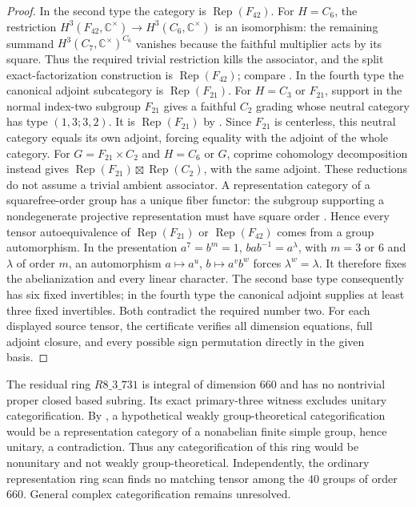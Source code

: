 \begin{proof}
In the second type the category is $\operatorname{Rep}(F_{42})$.
For $H=C_6$, the restriction $H^3(F_{42},\mathbb C^\times)\to
H^3(C_6,\mathbb C^\times)$ is an isomorphism: the remaining summand
$H^3(C_7,\mathbb C^\times)^{C_6}$ vanishes because the faithful
multiplier acts by its square. Thus the required trivial restriction
kills the associator, and the split exact-factorization construction
is $\operatorname{Rep}(F_{42})$; compare
\cite[Corollary~7.4]{EGODimPQ}.
In the fourth type the canonical adjoint subcategory is
$\operatorname{Rep}(F_{21})$. For $H=C_3$ or $F_{21}$, support in
the normal index-two subgroup $F_{21}$ gives a faithful $C_2$ grading
whose neutral category has type $(1,3;3,2)$. It is
$\operatorname{Rep}(F_{21})$ by \cite[Theorem~6.3]{EGODimPQ}.
Since $F_{21}$ is centerless, this neutral category equals its own
adjoint, forcing equality with the adjoint of the whole category.
For $G=F_{21}\times C_2$ and $H=C_6$ or $G$, coprime cohomology
decomposition instead gives
$\operatorname{Rep}(F_{21})\boxtimes\operatorname{Rep}(C_2)$,
with the same adjoint. These reductions do not assume a trivial
ambient associator.
A representation category of a squarefree-order group has a unique
fiber functor: the subgroup supporting a nondegenerate projective
representation must have square order
\cite[Section~3.4, Theorem~2 and Example~(i)]{OstrikModules}.
Hence every tensor autoequivalence of $\operatorname{Rep}(F_{21})$
or $\operatorname{Rep}(F_{42})$ comes from a group automorphism.
In the presentation $a^7=b^m=1$, $bab^{-1}=a^\lambda$, with
$m=3$ or $6$ and $\lambda$ of order $m$, an automorphism
$a\mapsto a^u$, $b\mapsto a^v b^w$ forces $\lambda^w=\lambda$.
It therefore fixes the abelianization and every linear character.
The second base type consequently has six fixed invertibles; in the
fourth type the canonical adjoint supplies at least three fixed
invertibles. Both contradict the required number two.
For each displayed source tensor, the certificate verifies all
dimension equations, full adjoint closure, and every possible sign
permutation directly in the given basis.
\end{proof}
\begin{remark}\label{rem:m3-r731}
The residual ring $R8\_3\_731$ is integral of dimension $660$ and
has no nontrivial proper closed based subring. Its exact primary-three
witness excludes unitary categorification. By
\cite[Proposition~9.11]{ENOSolvable}, a hypothetical weakly
group-theoretical categorification would be a representation category
of a nonabelian finite simple group, hence unitary, a contradiction.
Thus any categorification of this ring would be nonunitary and not
weakly group-theoretical. Independently, the ordinary representation
ring scan finds no matching tensor among the $40$ groups of order
$660$. General complex categorification remains unresolved.
\end{remark}
